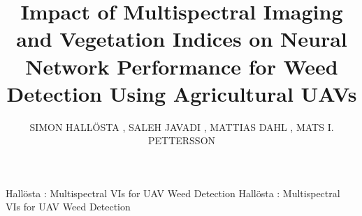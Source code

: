 \documentclass{ieeeaccess}
\providecommand{\DIFaddbegin}{} %
\providecommand{\DIFaddend}{} %
\providecommand{\DIFaddincludegraphics}[2][]{{\color{blue}\fbox{\DIFOincludegraphics[#1]{#2}}}} %
\DeclareRobustCommand{\DIFaddbegin}{\DIFOaddbegin \let\includegraphics\DIFaddincludegraphics} %
\DeclareRobustCommand{\DIFaddend}{\DIFOaddend \let\includegraphics\DIFOincludegraphics} %
\begin{document}
\DIFaddbegin {}
\DIFaddend 



\title{Impact of Multispectral Imaging and Vegetation Indices on Neural Network Performance for Weed Detection Using Agricultural UAVs}


\author{\uppercase{Simon Hallösta}
, 
\uppercase{Saleh Javadi}
, 
\uppercase{Mattias Dahl}
,
\uppercase{Mats I. Pettersson}
}


\address[1]{Department of Mathematics and Natural Sciences, Blekinge Institute of Technology, 371 79 Karlskrona, Sweden}


\markboth
{Hallösta \headeretal: Multispectral VIs for UAV Weed Detection}
{Hallösta \headeretal: Multispectral VIs for UAV Weed Detection}

\end{document}
